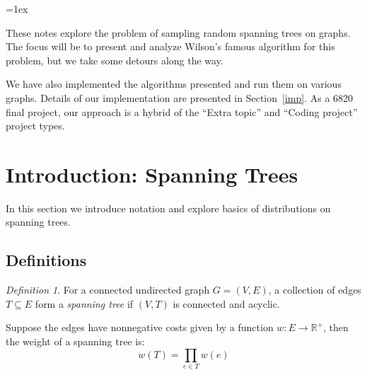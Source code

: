 \documentclass[11pt]{article}
\begin{document}
\newcommand\one{\textsf 1}
\newcommand\zero{\textsf 0}
\newcommand\cost{\mathcal C}
\newcommand\Prob{\text{Pr}}

\theoremstyle{remark}
\newtheorem{alg}{Algorithm}

\newtheorem{theorem}{Theorem}
\newtheorem{defn}{Definition}
\newtheorem{prop}{Proposition}

\setlength\parindent{0in}
\addtolength\parskip{1ex}
\setlength\fboxrule{.5mm}\setlength{\fboxsep}{1.2mm}
\newlength\courseheader
\setlength\courseheader\textwidth
\addtolength\courseheader{-4mm}
\parindent=0pt
\parskip=1ex

\begin{center}
\end{center}
\medskip

These notes explore the problem of sampling random spanning trees on graphs. The
focus will be to present and analyze Wilson's famous algorithm for this problem,
but we take some detours along the way.

We have also implemented the algorithms presented and run them on various
graphs. Details of our implementation are presented in Section~\ref{imp}.
As a 6820 final project, our approach is a hybrid of the ``Extra topic'' and ``Coding
project'' project types.

\section{Introduction: Spanning Trees}

In this section we introduce notation and explore basics of distributions on
spanning trees.

\subsection{Definitions}

\begin{defn}
For a connected undirected graph $G = (V, E)$, a collection of edges $T \subseteq E$
form a \emph{spanning tree} if $(V, T)$ is connected and acyclic.
\end{defn}

Suppose the edges have nonnegative costs given by a function $w\colon E \to
\mathbb{R^+}$, then the weight of a spanning tree is:
\[ w(T) = \prod_{e\in T} w(e) \]
\end{document}
